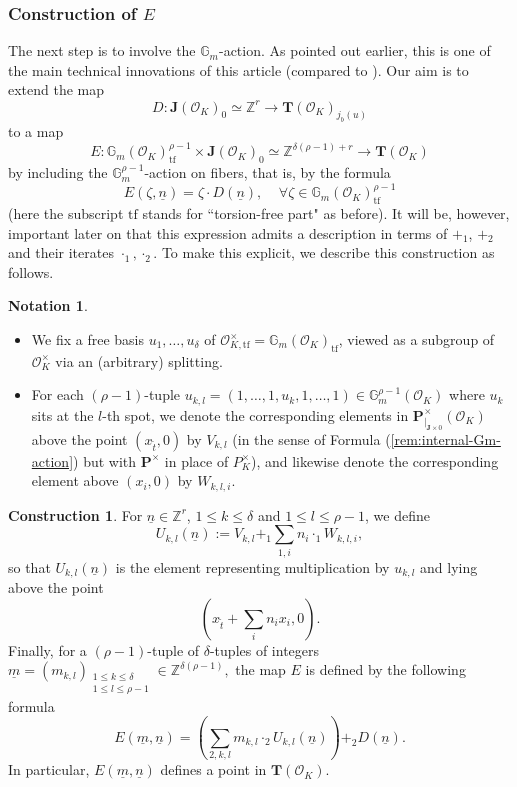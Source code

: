 \documentclass[11pt,oneside]{amsart}
\theoremstyle{plain}
\theoremstyle{definition}
\newtheorem{construction}[theorem]{Construction}
\newtheorem{notation}[theorem]{Notation}
\def\G{{\bf G}}
\def\TT{\mathbf{T}}
\def\Z{\mathbb{Z}}
\def\J{\mathbf{J}}
\def\G{\mathbb{G}}
\def\P{\mathbf{P}}
\def\oh{\mathcal{O}}
\begin{document}
\subsubsection{Construction of $E$}\label{ss:E}

The next step is to involve the $\G_m$-action. As pointed out earlier, this is one of the main technical innovations of this article (compared to \cite{EL19}). Our aim is to extend the map 
$$D: \J(\oh_K)_0 \simeq \Z^r \rightarrow \TT(\oh_K)_{j_b(u)}$$ to a map 
$$
E: \G_m(\oh_K)_{\mathrm{tf}}^{\rho-1} \times \J(\oh_K)_0 \simeq \Z^{\delta(\rho-1)+r} \longrightarrow  \TT(\oh_K)
$$
by including the $\G_m^{\rho-1}$-action on fibers, that is, by the formula
$$E(\zeta, \underline{n})=\zeta\cdot D(\underline{n}),\;\;\;\; \forall \zeta \in \G_m(\oh_K)_{\mathrm{tf}}^{\rho-1}$$
(here the subscript $\mathrm{tf}$ stands for ``torsion-free part" as before). It will be, however, important later on that this expression admits a description in terms of $+_1$, $+_2$ and their iterates $\cdot_1, \cdot_2$. To make this explicit, we describe this construction as follows.

\begin{notation}
\begin{itemize}
\item 
We fix a free basis $u_1, \dots, u_\delta$ of  $\oh_{K,\mathrm{tf}}^{\times}=\G_m(\oh_K)_{\mathrm{tf}}$, viewed as a subgroup of $\oh_K^{\times}$ via an (arbitrary) splitting. 
\item For each $(\rho-1)$-tuple $u_{k, l}=(1, \dots, 1, u_{k}, 1, \dots, 1) \in\G_m^{\rho-1}(\oh_K)$ where $u_k$ sits at the $l$-th spot, we denote the corresponding elements in $\P^{\times}_{\mid_{\J \times 0}}(\oh_K)$ above the point $(x_{\tilde{t}}, 0)$ by $V_{k, l}$ (in the sense of Formula (\ref{rem:internal-Gm-action}) but with $\P^\times$ in place of $P_K^\times$), and likewise denote the corresponding element above $(x_i, 0)$ by $W_{k, l, i}$.
\end{itemize}
\end{notation}

\begin{construction} \label{map:E}
For $\underline{n} \in \Z^r$, $1 \leq k \leq \delta$ and $1 \leq l \leq \rho-1$, we define 
$$U_{k, l}(\underline{n}):=V_{k, l}+_1 \sum_{1, i}n_i\cdot_1 W_{k, l, i},$$ 
so that $U_{k, l}(\underline{n})$ is the element representing multiplication by $u_{k, l}$ and lying above the point 
$$(x_{\tilde{t}}+\sum_i n_ix_i, 0).$$
Finally, for a $(\rho-1)$-tuple of $\delta$-tuples of integers $\underline{m}=(m_{k, l})_{\substack{1\leq k \leq \delta \\ 1\leq l \leq \rho-1}} \in \Z^{\delta(\rho-1)},$ the map $E$ is defined by the following formula 
$$E(\underline{m},\underline{n})=\left({\sum}_{2, k, l}m_{k, l}\cdot_2U_{k, l}(\underline{n})\right)+_2 D(\underline{n}).$$
 In particular, $E(\underline{m}, \underline{n})$ defines a point in $\TT(\oh_K)$. 
\end{construction}
\end{document}
